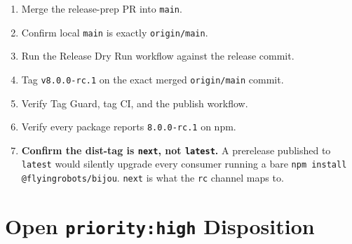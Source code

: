 \begin{enumerate}
\def\labelenumi{\arabic{enumi}.}
\tightlist
\item
  Merge the release-prep PR into \texttt{m\allowbreak{}a\allowbreak{}i\allowbreak{}n}.
\item
  Confirm local \texttt{m\allowbreak{}a\allowbreak{}i\allowbreak{}n} is exactly \texttt{o\allowbreak{}r\allowbreak{}i\allowbreak{}g\allowbreak{}i\allowbreak{}n\allowbreak{}/\allowbreak{}m\allowbreak{}a\allowbreak{}i\allowbreak{}n}.
\item
  Run the Release Dry Run workflow against the release commit.
\item
  Tag \texttt{v\allowbreak{}8\allowbreak{}.\allowbreak{}0\allowbreak{}.\allowbreak{}0\allowbreak{}-\allowbreak{}r\allowbreak{}c\allowbreak{}.\allowbreak{}1} on the exact merged \texttt{o\allowbreak{}r\allowbreak{}i\allowbreak{}g\allowbreak{}i\allowbreak{}n\allowbreak{}/\allowbreak{}m\allowbreak{}a\allowbreak{}i\allowbreak{}n} commit.
\item
  Verify Tag Guard, tag CI, and the publish workflow.
\item
  Verify every package reports \texttt{8\allowbreak{}.\allowbreak{}0\allowbreak{}.\allowbreak{}0\allowbreak{}-\allowbreak{}r\allowbreak{}c\allowbreak{}.\allowbreak{}1} on npm.
\item
  \textbf{Confirm the dist-tag is \texttt{n\allowbreak{}e\allowbreak{}x\allowbreak{}t}, not \texttt{l\allowbreak{}a\allowbreak{}t\allowbreak{}e\allowbreak{}s\allowbreak{}t}.} A prerelease published to \texttt{l\allowbreak{}a\allowbreak{}t\allowbreak{}e\allowbreak{}s\allowbreak{}t} would silently upgrade every consumer running a bare \texttt{n\allowbreak{}p\allowbreak{}m\allowbreak{} \allowbreak{}i\allowbreak{}n\allowbreak{}s\allowbreak{}t\allowbreak{}a\allowbreak{}l\allowbreak{}l\allowbreak{} \allowbreak{}@\allowbreak{}f\allowbreak{}l\allowbreak{}y\allowbreak{}i\allowbreak{}n\allowbreak{}g\allowbreak{}r\allowbreak{}o\allowbreak{}b\allowbreak{}o\allowbreak{}t\allowbreak{}s\allowbreak{}/\allowbreak{}b\allowbreak{}i\allowbreak{}j\allowbreak{}o\allowbreak{}u}. \texttt{n\allowbreak{}e\allowbreak{}x\allowbreak{}t} is what the \texttt{r\allowbreak{}c} channel maps to.
\end{enumerate}

\section{\texorpdfstring{Open \texttt{p\allowbreak{}r\allowbreak{}i\allowbreak{}o\allowbreak{}r\allowbreak{}i\allowbreak{}t\allowbreak{}y\allowbreak{}:\allowbreak{}h\allowbreak{}i\allowbreak{}g\allowbreak{}h} Disposition}{Open  Disposition}}\label{record-262-open-priorityhigh-disposition}


